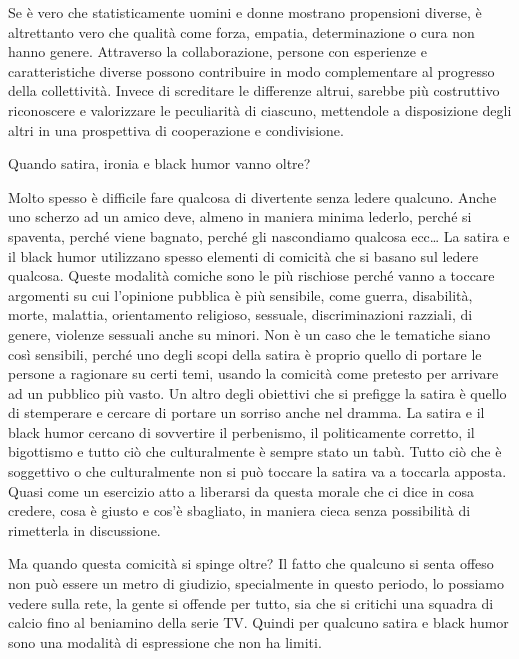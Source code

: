 \documentclass[12pt]{book} %
\begin{document}
Se è vero che statisticamente uomini e donne mostrano propensioni diverse, è altrettanto vero che qualità come forza, empatia, determinazione o cura non hanno genere. Attraverso la collaborazione, persone con esperienze e caratteristiche diverse possono contribuire in modo complementare al progresso della collettività. Invece di screditare le differenze altrui, sarebbe più costruttivo riconoscere e valorizzare le peculiarità di ciascuno, mettendole a disposizione degli altri in una prospettiva di cooperazione e condivisione.

\begin{mdframed}[linewidth=1pt]
Quando satira, ironia e black humor vanno oltre?

Molto spesso è difficile fare qualcosa di divertente senza ledere qualcuno. Anche uno scherzo ad un amico deve, almeno
in maniera minima lederlo, perché si spaventa, perché viene bagnato, perché gli nascondiamo qualcosa ecc… La satira e
il black humor utilizzano spesso elementi di comicità che si basano sul ledere qualcosa. Queste modalità comiche sono
le più rischiose perché vanno a toccare argomenti su cui l'opinione pubblica è più sensibile, come
guerra, disabilità, morte, malattia, orientamento religioso, sessuale, discriminazioni razziali, di genere, violenze
sessuali anche su minori. Non è un caso che le tematiche siano così sensibili, perché uno degli scopi della satira è
proprio quello di portare le persone a ragionare su certi temi, usando la comicità come pretesto per arrivare ad un
pubblico più vasto. Un altro degli obiettivi che si prefigge la satira è quello di stemperare e cercare di portare un
sorriso anche nel dramma. La satira e il black humor cercano di sovvertire il perbenismo, il politicamente corretto, il
bigottismo e tutto ciò che culturalmente è sempre stato un tabù. Tutto ciò che è soggettivo o che culturalmente non si
può toccare la satira va a toccarla apposta. Quasi come un esercizio atto a liberarsi da questa morale che ci dice in
cosa credere, cosa è giusto e cos'è sbagliato, in maniera cieca senza possibilità di rimetterla in
discussione. 

Ma quando questa comicità si spinge oltre? Il fatto che qualcuno si senta offeso non può essere un metro di giudizio,
specialmente in questo periodo, lo possiamo vedere sulla rete, la gente si offende per tutto, sia che si critichi una
squadra di calcio fino al beniamino della serie TV. Quindi per qualcuno satira e black humor sono una modalità di
espressione che non ha limiti.


\end{mdframed}
\end{document}

